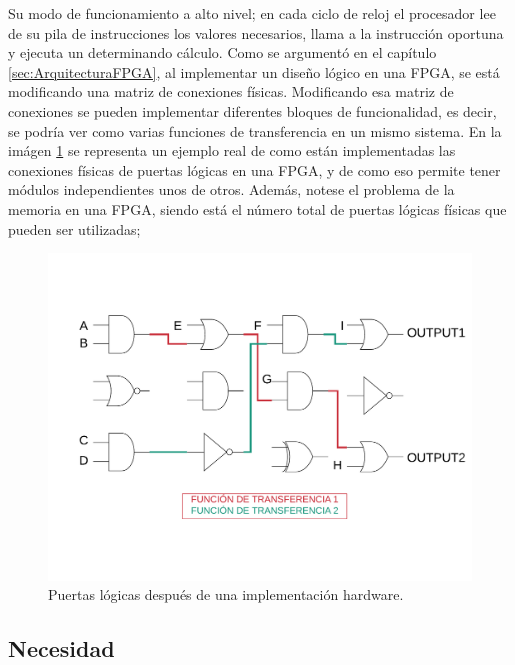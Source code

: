 Su modo de funcionamiento a alto nivel; en cada ciclo de reloj el procesador lee de su pila de instrucciones los valores necesarios, llama a la instrucción oportuna y ejecuta un determinando cálculo.\newline
Como se argumentó en el capítulo \ref{sec:ArquitecturaFPGA}, al implementar un diseño lógico en una FPGA, se está modificando una matriz de conexiones físicas. Modificando esa matriz de conexiones se pueden implementar diferentes bloques de funcionalidad, es decir, se podría ver como varias funciones de transferencia en un mismo sistema.\newline
En la imágen \ref{fig:puertas_logicas} se representa un ejemplo real de como están implementadas las conexiones físicas de puertas lógicas en una FPGA, y de como eso permite tener módulos independientes unos de otros. Además, notese el problema de la memoria en una FPGA, siendo está el número total de puertas lógicas físicas que pueden ser utilizadas;
\begin{center}
\begin{figure}[H]
	\center
	\includegraphics[scale=0.4]{imagenes/EstadoArte/puertas_logicas.pdf}
	\caption{Puertas lógicas después de una implementación hardware.}
	\label{fig:puertas_logicas}
\end{figure}
\end{center} 

\subsection{Necesidad}

